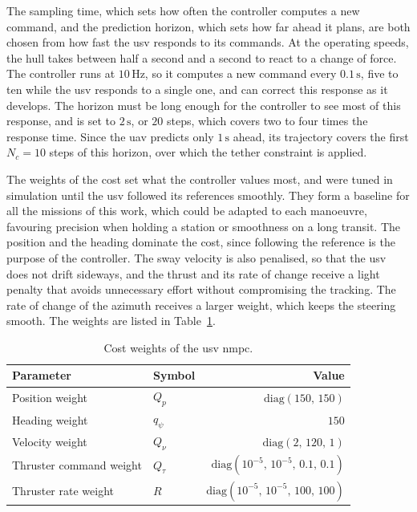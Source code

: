 The sampling time, which sets how often the controller computes a new command, and the prediction horizon, which sets how far ahead it plans, are both chosen from how fast the \gls{usv} responds to its commands. At the operating speeds, the hull takes between half a second and a second to react to a change of force. The controller runs at $10\,\text{Hz}$, so it computes a new command every $0.1\,\text{s}$, five to ten while the \gls{usv} responds to a single one, and can correct this response as it develops. The horizon must be long enough for the controller to see most of this response, and is set to $2\,\text{s}$, or $20$ steps, which covers two to four times the response time. Since the \gls{uav} predicts only $1\,\text{s}$ ahead, its trajectory covers the first $N_c = 10$ steps of this horizon, over which the tether constraint is applied.

The weights of the cost set what the controller values most, and were tuned in simulation until the \gls{usv} followed its references smoothly. They form a baseline for all the missions of this work, which could be adapted to each manoeuvre, favouring precision when holding a station or smoothness on a long transit. The position and the heading dominate the cost, since following the reference is the purpose of the controller. The sway velocity is also penalised, so that the \gls{usv} does not drift sideways, and the thrust and its rate of change receive a light penalty that avoids unnecessary effort without compromising the tracking. The rate of change of the azimuth receives a larger weight, which keeps the steering smooth. The weights are listed in Table~\ref{tab:usv_ctrl_weights}.

\begin{table}[htbp]
    \centering
    \caption{Cost weights of the \gls{usv} \gls{nmpc}.}
    \label{tab:usv_ctrl_weights}
    \begin{tabular*}{0.75\linewidth}{@{\extracolsep{\fill}}llr}
        \toprule
        \textbf{Parameter} & \textbf{Symbol} & \textbf{Value} \\
        \midrule
        Position weight & $Q_p$ & $\mathrm{diag}(150,\,150)$ \\
        Heading weight & $q_\psi$ & $150$ \\
        Velocity weight & $Q_\nu$ & $\mathrm{diag}(2,\,120,\,1)$ \\
        Thruster command weight & $Q_\tau$ & $\mathrm{diag}(10^{-5},\,10^{-5},\,0.1,\,0.1)$ \\
        Thruster rate weight & $R$ & $\mathrm{diag}(10^{-5},\,10^{-5},\,100,\,100)$ \\
        \bottomrule
    \end{tabular*}
\end{table}

